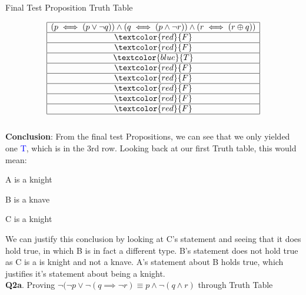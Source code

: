 \documentclass[12pt, letterpaper]{article}
\begin{document}
{\large\centerline{Final Test Proposition Truth Table}}

\begin{displaymath}
    \begin{array}{|c|}
    \hline
    (p \iff (p \lor \neg q)) \land (q \iff (p \land \neg r)) \land (r \iff (r \oplus q))\\ %
    \hline %
    \textcolor{red}{F}\\
    \hline
    \textcolor{red}{F}\\
    \hline
    \textcolor{blue}{T}\\
    \hline
    \textcolor{red}{F}\\
    \hline
    \textcolor{red}{F}\\
    \hline
    \textcolor{red}{F}\\
    \hline
    \textcolor{red}{F}\\
    \hline
    \textcolor{red}{F}\\
    \hline
    \end{array}
\end{displaymath} \\[0.5in]

\noindent\textbf{Conclusion}: From the final test Propositions, we can see that we only yielded one \textcolor{blue}{T}, which is in the 3rd row. Looking back at our first Truth table, this would mean: \\

{\large\centerline{ A is a knight}}
{\large\centerline{B is a knave}}
{\large\centerline{ C is a knight}}\vspace{1cm}

\noindent We can justify this conclusion by looking at C's statement and seeing that it does hold true, in which B is in fact a different type. B's statement does not hold true as C is a is knight and not a knave. A's statement about B holds true, which justifies it's statement about being a knight.\\[0.2in]

\noindent\textbf{Q2a}. Proving $\neg(\neg p \lor \neg(q \implies \neg r) \equiv p \land \neg(q \land r)$ through Truth Table\\
\end{document}
